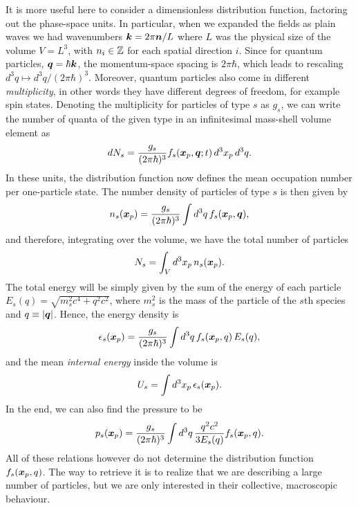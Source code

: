 It is more useful here to consider a dimensionless distribution function, factoring out the phase-space units. In particular, when we expanded the fields as plain waves we had wavenumbers $\bm{k} = 2\pi\bm{n}/L$ where $L$ was the physical size of the volume $V = L^3$, with $n_i \in \mathbb{Z}$ for each spatial direction $i$. Since for quantum particles, $\bm{q} =\hbar \bm{k}$, the momentum-space spacing is $2\pi\hbar$, which leads to rescaling $d^3q \mapsto d^3q/(2\pi\hbar)^3$. Moreover, quantum particles also come in different \emph{multiplicity}, in other words they have different degrees of freedom, for example spin states. Denoting the multiplicity for particles of type $s$ as $g_s$, we can write the number of quanta of the given type in an infinitesimal mass-shell volume element as 
\begin{equation}
    dN_s = \frac{g_s}{(2\pi\hbar)^3}f_s(\bm{x}_p,\bm{q};t)\,d^3x_p\,d^3q.
\end{equation}
In these units, the distribution function now defines the mean occupation number per one-particle state. The number density of particles of type $s$ is then given by 
\begin{equation}
\label{eq: number density of particles of type s}
    n_s(\bm{x}_p) = \frac{g_s}{(2\pi\hbar)^3}\int d^3q\,f_s(\bm{x}_p,\bm{q}),
\end{equation} 
and therefore, integrating over the volume, we have the total number of particles 
\begin{equation}
\label{eq: number of particles of type s}
    N_s = \int_V d^3x_p\,n_s(\bm{x}_p).
\end{equation}
The total energy will be simply given by the sum of the energy of each particle $E_s(q) = \sqrt{m_s^2c^4 + q^2c^2}$, where $m_s^2$ is the mass of the particle of the $s$th species and $q \equiv |\bm{q}|$. Hence, the energy density is 
\begin{equation}
\label{eq: energy density of particles of type s}
    \epsilon_s(\bm{x}_p) = \frac{g_s}{(2\pi\hbar)^3}\int d^3q\,f_s(\bm{x}_p,q)\,E_s(q),
\end{equation}
and the mean \emph{internal energy} inside the volume is 
\begin{equation}
\label{eq: internal energy density of particles of type s}
    U_s = \int d^3x_p\,\epsilon_s(\bm{x}_p).
\end{equation}
In the end, we can also find the pressure to be 
\begin{equation}
\label{eq: pressure of particles of type s}
    p_s(\bm{x}_p) = \frac{g_s}{(2\pi\hbar)^3}\int d^3q\,\frac{q^2c^2}{3E_s(q)}f_s(\bm{x}_p,q).
\end{equation}
All of these relations however do not determine the distribution function $f_s(\bm{x}_p,q)$. The way to retrieve it is to realize that we are describing a large number of particles, but we are only interested in their collective, macroscopic behaviour. 

